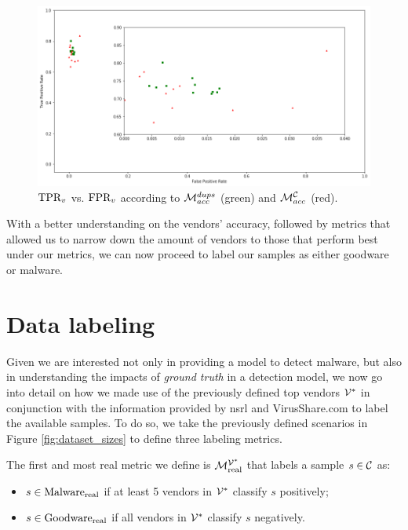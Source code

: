 \begin{figure}[!h]
	\centering
	\includegraphics[width=\textwidth]{Figures/dr_fpr_top.png}
	\caption{$\textrm{TPR}_v$ vs. $\textrm{FPR}_v$ according to $\mathcal{M}_{acc}^{{dups}}$ (green) and $\mathcal{M}_{acc}^{\mathcal{C}}$ (red).}
	\label{fig:dr_fpr_top}
\end{figure}

With a better understanding on the vendors' accuracy, followed by metrics that allowed us to narrow down the amount of vendors to those that perform best under our metrics, we can now proceed to label our samples as either goodware or malware.

\section{Data labeling}
\label{section:data_labeling}

Given we are interested not only in providing a model to detect malware, but also in understanding the impacts of \textit{ground truth} in a detection model, we now go into detail on how we made use of the previously defined top vendors $\mathcal{V}^*$ in conjunction with the information provided by \gls{nsrl} and VirusShare.com to label the available samples.
To do so, we take the previously defined scenarios in Figure \ref{fig:dataset_sizes} to define three labeling metrics.

The first and most real metric we define is $\mathcal{M}_{\mathrm{real}}^{\mathcal{V}^*}$ that labels a sample $s\in\mathcal{C}$ as:

\begin{itemize}
	\item $s\in\mathrm{Malware}_{\mathrm{real}}$ if at least 5 vendors in $\mathcal{V}^*$ classify $s$ positively;
	\item $s\in\mathrm{Goodware}_{\mathrm{real}}$ if all vendors in $\mathcal{V}^*$ classify $s$ negatively.
\end{itemize}


